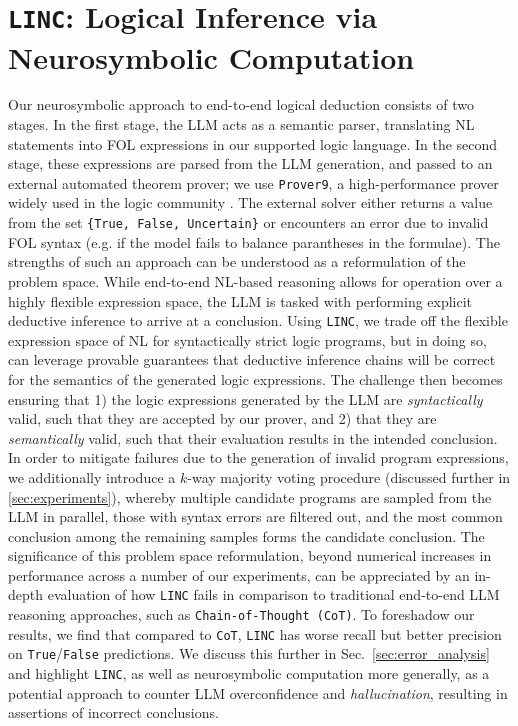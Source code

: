 \documentclass[11pt]{article}
\begin{document}

\section{\texttt{LINC}: Logical Inference via Neurosymbolic Computation}
\label{sec:ns-model}
Our neurosymbolic approach to end-to-end logical deduction consists of two stages. In the first stage, the LLM acts as a semantic parser, translating NL statements into FOL expressions in our supported logic language.
In the second stage, these expressions are parsed from the LLM generation, and passed to an external automated theorem prover; we use \texttt{Prover9}, a high-performance prover widely used in the logic community \citep{prover9-mace4}.
The external solver either returns a value from the set \texttt{\{True, \texttt{False}, Uncertain\}} or encounters an error due to invalid FOL syntax (e.g. if the model fails to balance parantheses in the formulae).
The strengths of such an approach can be understood as a reformulation of the problem space.
While end-to-end NL-based reasoning allows for operation over a highly flexible expression space, the LLM is tasked with performing explicit deductive inference to arrive at a conclusion.
Using \texttt{LINC}, we trade off the flexible expression space of NL for syntactically strict logic programs, but in doing so, can leverage provable guarantees that deductive inference chains will be correct for the semantics of the generated logic expressions.
The challenge then becomes ensuring that 1) the logic expressions generated by the LLM are \textit{syntactically} valid, such that they are accepted by our prover, and 2) that they are \textit{semantically} valid, such that their evaluation results in the intended conclusion.
In order to mitigate failures due to the generation of invalid program expressions, we additionally introduce a $k$-way majority voting procedure (discussed further in \ref{sec:experiments}), whereby multiple candidate programs are sampled from the LLM in parallel, those with syntax errors are filtered out, and the most common conclusion among the remaining samples forms the candidate conclusion.
The significance of this problem space reformulation, beyond numerical increases in performance across a number of our experiments, can be appreciated by an in-depth evaluation of how \texttt{LINC} fails in comparison to traditional end-to-end LLM reasoning approaches, such as \texttt{Chain-of-Thought (CoT)}.
To foreshadow our results, we find that compared to \texttt{CoT}, \texttt{LINC} has worse recall but better precision on \texttt{True}/\texttt{False} predictions.
We discuss this further in Sec.~\ref{sec:error_analysis} and highlight \texttt{LINC}, as well as neurosymbolic computation more generally, as a potential approach to counter LLM overconfidence and \textit{hallucination}, resulting in assertions of incorrect conclusions.
\end{document}
